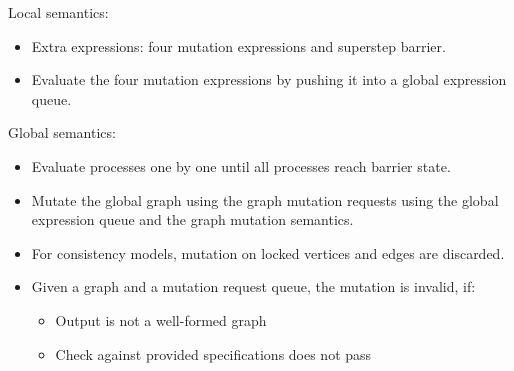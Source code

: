 \begin{frame}
Local semantics:\\
\begin{itemize}
  \item Extra expressions: four mutation expressions and superstep barrier.
  \item Evaluate the four mutation expressions by pushing it into a global
  expression queue.
\end{itemize}
\end{frame}

\begin{frame}
Global semantics:\\
\begin{itemize}
  \item Evaluate processes one by one until all processes reach barrier state.
  \item Mutate the global graph using the graph mutation requests using the
  global expression queue and the graph mutation semantics.
  \item For consistency models, mutation on locked vertices and edges are
  discarded.
  \item Given a graph and a mutation request queue, the mutation is invalid, if:
  \begin{itemize}
    \item Output is not a well-formed graph
    \item Check against provided specifications does not pass 
  \end{itemize}
\end{itemize}
\end{frame}
